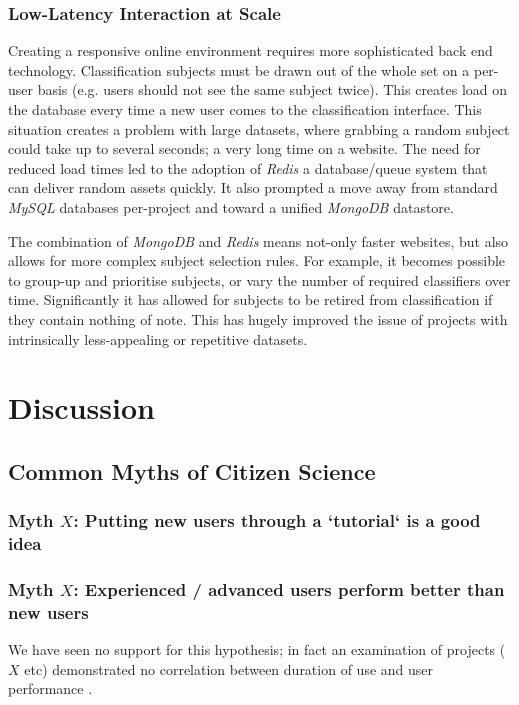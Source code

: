 \documentclass{sigchi}
\begin{document}
\subsubsection{Low-Latency Interaction at Scale}
Creating a responsive online environment requires more sophisticated back end technology. Classification subjects must be drawn out of the whole set on a per-user basis (e.g. users should not see the same subject twice). This creates load on the database every time a new user comes to the classification interface. This situation creates a problem with large datasets, where grabbing a random subject could take up to several seconds; a very long time on a website. The need for reduced load times led to the adoption of \emph{Redis} a database/queue system that can deliver random assets quickly. It also prompted a move away from standard \emph{MySQL} databases per-project and toward a unified \emph{MongoDB} datastore.

The combination of \emph{MongoDB} and \emph{Redis} means not-only faster websites, but also allows for more complex subject selection rules. For example, it becomes possible to group-up and prioritise subjects, or vary the number of required classifiers over time. Significantly it has allowed for subjects to be retired from classification if they contain nothing of note. This has hugely improved the issue of projects with intrinsically less-appealing or repetitive datasets.  


\section{Discussion}

\subsection{Common Myths of Citizen Science}
\subsubsection{Myth $X$: Putting new users through a `tutorial` is a good idea}
\subsubsection{Myth $X$: Experienced / advanced users perform better than new users}
We have seen no support for this hypothesis; in fact an examination of projects ($X$ etc) demonstrated no correlation between duration of use and user performance \cite{simpson2013dynamic}. 
\end{document}
